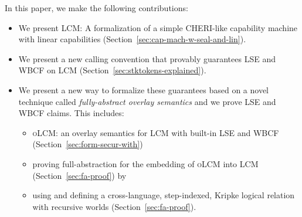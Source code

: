 \documentclass[acmsmall,screen]{acmart}\settopmatter{}
\newcommand{\trgcm}{\textsc{LCM}}
\newcommand{\srccm}{\textsc{oLCM}}
\begin{document}
In this paper, we make the following contributions:
\begin{itemize}
\item We present \trgcm{}: A formalization of a simple CHERI-like capability machine with linear capabilities (Section~\ref{sec:cap-mach-w-seal-and-lin}).
\item We present a new calling convention \stktokens{} that provably guarantees LSE and WBCF on \trgcm{} (Section~\ref{sec:stktokens-explained}).
\item We present a new way to formalize these guarantees based on a novel
  technique called \textit{fully-abstract overlay semantics} and we prove LSE
  and WBCF claims. This includes:
  \begin{itemize}
  \item \srccm{}: an overlay semantics for \trgcm{} with built-in LSE and WBCF (Section~\ref{sec:form-secur-with})
  \item proving full-abstraction for the embedding of \srccm{} into \trgcm{} (Section~\ref{sec:fa-proof}) by
  \item using and defining a cross-language, step-indexed, Kripke logical relation with recursive worlds (Section~\ref{sec:fa-proof}).
  \end{itemize}
\end{itemize}
\end{document}
